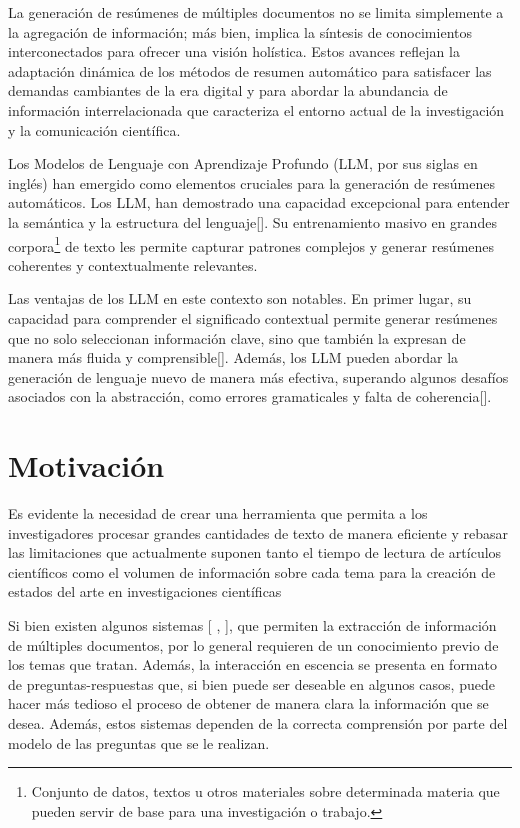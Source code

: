     La generación de resúmenes de múltiples documentos no se limita simplemente a la agregación de información; más bien, implica la síntesis de conocimientos interconectados para ofrecer una visión holística. 
    Estos avances reflejan la adaptación dinámica de los métodos de resumen automático para satisfacer las demandas cambiantes de la era digital y para abordar la abundancia de información interrelacionada que caracteriza el entorno actual de la investigación y la comunicación científica.

    Los Modelos de Lenguaje con Aprendizaje Profundo (LLM, por sus siglas en inglés) han emergido como elementos cruciales para la generación de resúmenes automáticos. Los LLM, han demostrado una capacidad excepcional para entender la semántica y la estructura del lenguaje[\cite{fewshot}]. Su entrenamiento masivo en grandes corpora\footnote{Conjunto de datos, textos u otros materiales sobre determinada materia que pueden servir de base para una investigación o trabajo.} de texto les permite capturar patrones complejos y generar resúmenes coherentes y contextualmente relevantes.

    Las ventajas de los LLM en este contexto son notables. En primer lugar, su capacidad para comprender el significado contextual permite generar resúmenes que no solo seleccionan información clave, sino que también la expresan de manera más fluida y comprensible[\cite{Radford2018ImprovingLU}]. Además, los LLM pueden abordar la generación de lenguaje nuevo de manera más efectiva, superando algunos desafíos asociados con la abstracción, como errores gramaticales y falta de coherencia[\cite{RoBERTa}].

\section{Motivación}
    Es evidente la necesidad de crear una herramienta que permita a los investigadores procesar grandes cantidades de texto de manera eficiente y rebasar las limitaciones que actualmente suponen tanto el tiempo de lectura de artículos científicos como el volumen de información sobre cada tema para la creación de estados del arte en investigaciones científicas

    Si bien existen algunos sistemas [\cite{elicit} , \cite{scite}], que permiten la extracción de información de múltiples documentos, por lo general requieren de un conocimiento previo de los temas que tratan. Además, la interacción en escencia se presenta en formato de preguntas-respuestas que, si bien puede ser deseable en algunos casos, puede hacer más tedioso el proceso de obtener de manera clara la información que se desea. Además, estos sistemas dependen de la correcta comprensión por parte del modelo de las preguntas que se le realizan.\par

